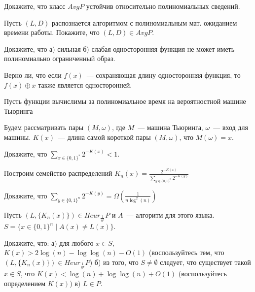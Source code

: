 \setcounter{curtask}{1}


\begin{task}
    Докажите, что класс $AvgP$ устойчив относительно полиномиальных сведений.
\end{task}

\begin{task}
    Пусть $(L, D)$ распознается алгоритмом с полиномиальным мат. ожиданием времени
    работы. Покажите, что $(L, D) \in AvgP$.
\end{task}

\begin{task}
    Докажите, что а) сильная б) слабая односторонняя функция не может иметь
    полиномиально ограниченный образ.
\end{task}

\begin{task}
    Верно ли, что если $f(x)$~--- сохраняющая длину односторонняя функция, то $f(x)
    \oplus x$ также является односторонней.
\end{task}

\begin{task}
    Пусть функции вычислимы за полиномиальное время на вероятностной машине Тьюринга 
\end{task}

\breakline

Будем рассматривать пары $(M, \omega)$, где $M$~--- машина Тьюринга, $\omega$~---
вход для машины. $K(x)$~--- длина самой короткой пары $(M, \omega)$, что $M(\omega) =
x$.

\begin{task}
    Докажите, что $\sum\limits_{x \in \{0, 1\}^*} 2^{-K(x)} < 1$.
\end{task}

Построим семейство распределений
$K_{n}(x) = \frac{2^{-K(x)}}{\sum\limits_{y \in \{0, 1\}^n} 2^{-K(y)}}$

\begin{task}
    Докажите, что $\sum\limits_{y \in \{0, 1\}^n} 2^{-K(y)} = \Omega(\frac{1}{n \log^2(n)})$
\end{task}

Пусть $(L, \{K_n(x)\}) \in Heur_{\frac{1}{n^3}}P$ и $A$~--- алгоритм для этого языка.
$S = \{x \in \{0, 1\}^n \mid A(x) \neq L(x)\}$.

\begin{task}
    Докажите, что:
    а) для любого $x \in S$, $K(x) > 2\log(n) - \log\log(n) - O(1)$ (воспользуйтесь
    тем, что $(L, \{K_n(x)\}) \in Heur_{\frac{1}{n^3}}P$)
    б) из того, что $S \neq \emptyset$ следует, что существует такой $x \in S$, что
    $K(x) < \log(n) + \log\log(n) + O(1)$ (воспользуйтесь определением $K(x)$)
    в) $L\in P$.
\end{task}
